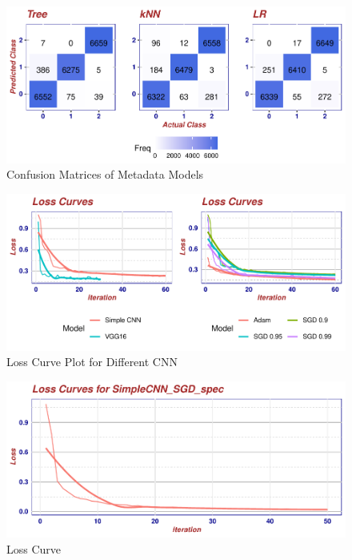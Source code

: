 \documentclass[
  11pt,
]{article}
\begin{document}
\begin{figure}
\centering
\includegraphics{final_report_files/figure-latex/cm-metadata-1.pdf}
\caption{\label{fig:cm-metadata}Confusion Matrices of Metadata Models}
\end{figure}

\begin{figure}
\centering
\includegraphics{final_report_files/figure-latex/loss-cnns-1.pdf}
\caption{\label{fig:loss-cnns}Loss Curve Plot for Different CNN}
\end{figure}

\begin{figure}
\centering
\includegraphics{final_report_files/figure-latex/loss-simp-cnn-1.pdf}
\caption{\label{fig:loss-simp-cnn}Loss Curve}
\end{figure}
\end{document}
